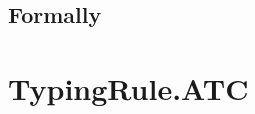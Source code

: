 \documentclass{book}
\begin{document}
\begin{itemize}

\begin{emptyformal}
    \subsection{Formally}
\end{emptyformal}


\section{TypingRule.ATC \label{sec:TypingRule.ATC}}


\end{itemize}
\end{document}
